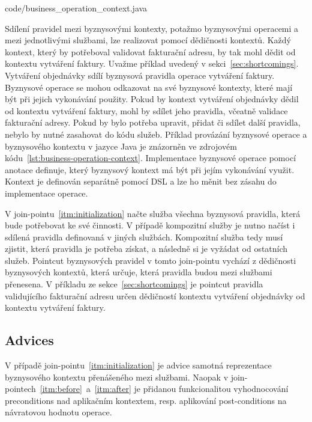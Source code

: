 
{code/business_operation_context.java}

Sdílení pravidel mezi byznysovými kontexty, potažmo byznysovými operacemi a mezi jednotlivými službami,
lze realizovat pomocí dědičnosti kontextů. Každý kontext, který by potřeboval validovat fakturační
adresu, by tak mohl dědit od kontextu vytváření faktury. Uvažme příklad uvedený v sekci~\ref{sec:shortcomings}.
Vytváření objednávky sdílí byznysová pravidla operace vytváření faktury. Byznysové operace se mohou odkazovat
na své byznysové kontexty, které mají být při jejich vykonávání použity. Pokud by kontext vytváření objednávky
dědil od kontextu vytváření faktury, mohl by sdílet jeho pravidla, včeatně validace fakturační adresy. Pokud by bylo
potřeba upravit, přidat či sdílet další pravidla, nebylo by nutné zasahovat do kódu služeb. Příklad provázání
byznysové operace a byznysového kontextu v jazyce Java je znázorněn ve zdrojovém kódu~\ref{lst:business-operation-context}.
Implementace byznysové operace pomocí anotace  definuje, který byznysový kontext má být
při jejím vykonávání využit. Kontext je definován separátně pomocí \gls{DSL} a lze ho měnit bez zásahu do implementace
operace.

V join-pointu~\ref{itm:initialization} načte služba všechna byznysová pravidla, která
bude potřebovat ke své činnosti. V případě kompozitní služby je nutno načíst i sdílená pravidla
definovaná v jiných službách. Kompozitní služba tedy musí zjistit, která pravidla je potřeba získat,
a následně si je vyžádat od ostatních služeb. Pointcut byznysových pravidel v tomto join-pointu vychází
z dědičnosti byznysových kontextů, která určuje, která pravidla budou mezi službami přenesena.
V příkladu ze sekce~\ref{sec:shortcomings} je pointcut pravidla validujícího fakturační adresu
určen dědičností kontextu vytváření objednávky od kontextu vytváření faktury.


\subsection{Advices}

V případě join-pointu~\ref{itm:initialization} je advice samotná reprezentace byznysového
kontextu přenášeného mezi službami. Naopak v join-pointech~\ref{itm:before}~a~\ref{itm:after}
je přidanou funkcionalitou vyhodnocování preconditions nad aplikačním kontextem, resp. aplikování
post-conditions na návratovou hodnotu operace.

